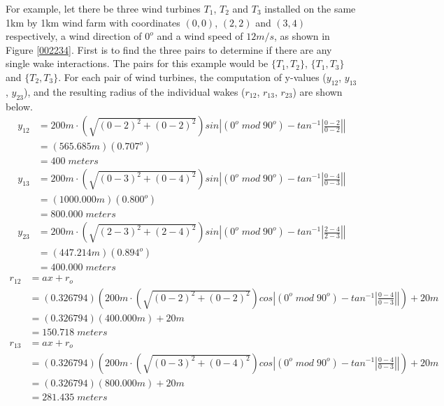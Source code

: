     For example, let there be three wind turbines $T_1$, $T_2$ and $T_3$ installed on the same 1km by 1km wind farm with coordinates $(0,0)$, $(2,2)$ and $(3,4)$ respectively, a wind direction of $0^o$ and a wind speed of $12m/s$, as shown in Figure \ref{002234}. First is to find the three pairs to determine if there are any single wake interactions. The pairs for this example would be $\{T_1,T_2\}$, $\{T_1,T_3\}$ and $\{T_2,T_3\}$. For each pair of wind turbines, the computation of  y-values ($y_{12}$, $y_{13}$, $y_{23}$), and the resulting radius of the individual wakes ($r_{12}$, $r_{13}$, $r_{23}$) are shown below.
    \begin{align*}
        y_{12}
        &=200m\cdot \left( \sqrt{(0-2)^2+(0-2)^2} \right)sin \left| (0^o\;mod\;90^o) - tan^{-1}\left|\frac{0-2}{0-2}\right| \right| \\
        &=\left( 565.685m \right)(0.707^o) \\
        &= 400\;meters
    \end{align*}
    \begin{align*}
        y_{13}
        &=200m\cdot \left( \sqrt{(0-3)^2+(0-4)^2} \right)sin \left| (0^o\;mod\;90^o) - tan^{-1}\left|\frac{0-4}{0-3}\right| \right| \\
        &=\left( 1000.000m \right)(0.800^o) \\
        &= 800.000\;meters
    \end{align*}
    \begin{align*}
        y_{23}
        &=200m\cdot \left( \sqrt{(2-3)^2+(2-4)^2} \right)sin \left| (0^o\;mod\;90^o) - tan^{-1}\left|\frac{2-4}{2-3}\right| \right| \\
        &=\left( 447.214m \right)(0.894^o) \\
        &= 400.000\;meters
    \end{align*}
    \begin{align*}
        r_{12}
        &= ax+r_o \\
        &= (0.326794)\left( 200m\cdot \left( \sqrt{(0-2)^2+(0-2)^2} \right)cos \left| (0^o\;mod\;90^o) - tan^{-1}\left|\frac{0-4}{0-3}\right| \right| \right) + 20m \\
        &=(0.326794)(400.000m)+20m \\
        &= 150.718\;meters
    \end{align*}
    \begin{align*}
        r_{13}
        &= ax+r_o \\
        &= (0.326794)\left( 200m\cdot \left( \sqrt{(0-3)^2+(0-4)^2} \right)cos \left| (0^o\;mod\;90^o) - tan^{-1}\left|\frac{0-4}{0-3}\right| \right| \right) + 20m \\
        &=(0.326794)(800.000m)+20m \\
        &= 281.435\;meters
    \end{align*}
